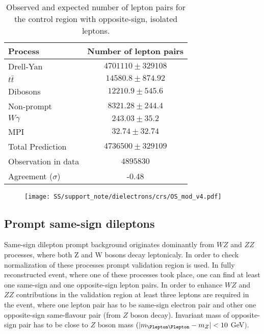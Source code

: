 \begin{table}[htbp]
\caption{Observed and expected number of lepton pairs for the control region with opposite-sign, isolated leptons.} %
\begin{center}
\begin{tabular}{l|c}

Process & Number of lepton pairs \\\hline\hline
        Drell-Yan	& $ 4701110 \pm 329108 $	\\[+0.05in]
	$t\bar{t}$	& $ 14580.8 \pm 874.92 $	\\[+0.05in]
	Dibosons	& $ 12210.9 \pm 545.6 $	\\[+0.05in]
	Non-prompt	& $ 8321.28 \pm 244.4 $	\\[+0.05in]
	$W\gamma$	& $ 243.03 \pm 35.2 $	\\[+0.05in]
	MPI	& $ 32.74 \pm 32.74 $	\\[+0.05in]
	\hline
	Total Prediction	& $ 4736500 \pm 329109 $	\\[+0.05in]
	\hline
	Observation in data	& $ 4895830 $	\\[+0.05in]
	\hline
	Agreement ($\sigma$) & -0.48 \\[+0.05in]

\hline  
\end{tabular}
\end{center}
\label{tab:dilep_isoOS}
\end{table}

\begin{figure}[h]
\begin{center}
\texttt{[image: SS/support\_note/dielectrons/crs/OS\_mod\_v4.pdf]}
\caption{\toDo}
\label{fig:OS_CR}
\end{center}
\end{figure} 



\subsection{Prompt same-sign dileptons}

Same-sign dilepton prompt background originates dominantly from $WZ$ and $ZZ$ processes, where both Z and W bosons decay leptonicaly.
In order to check normalization of these processes prompt validation region is used.
In fully reconstructed event, where one of these processes took place, one can find at least one same-sign and one opposite-sign lepton pairs.
In order to enhance $WZ$ and $ZZ$ contributions in the validation region at least three leptons are required in the event, where one lepton pair
has to be same-sign electron pair and other one opposite-sign same-flavour pair (from $Z$ boson decay). 
Invariant mass of opposite-sign pair has to be close to $Z$ boson mass $(|m_{\Plepton\Plepton} - m_{Z}| < 10$ GeV$)$.


